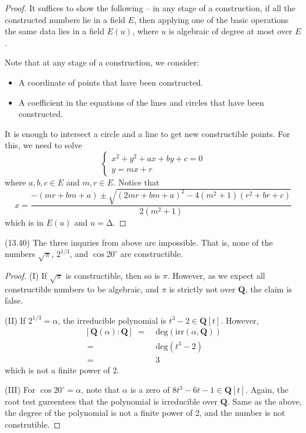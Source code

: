 \vspace{2ex}
\begin{proof}
It suffices to show the following -- in any stage of a construction, if all the constructed numbers lie in a field $E$, then applying one of the basic operations the same data lies in a field $E(u)$, where $u$ is algebraic of degree at most over $E$.

\bigskip

Note that at any stage of a construction, we consider:
\begin{itemize}
\item[(i)] A coordinate of points that have been constructed.
\item[(ii)] A coefficient in the equations of the lines and circles that have been constructed.
\end{itemize}

\bigskip

It is enough to intersect a circle and a line to get new constructible points. For this, we need to solve
\[\begin{cases}
x^2+y^2+ax+by+c=0\\
y=mx+r
\end{cases}\]
where $a,b,c\in E$ and $m,r\in E$. Notice that
\[x=\dfrac{-(mr+bm+a)\pm \sqrt{(2mr+bm+a)^2-4(m^2+1)(r^2+br+c)}}{2(m^2+1)}\]
which is in $E(u)$ and $u=\mathrm{\Delta }$.
\end{proof}
\vspace{2ex}
\begin{cor}
(13.40) The three inquries from above are impossible. That is, none of the numbers $\sqrt{\pi }$, ${2}^{1/3}$, and $\cos 20^{\circ}$ are constructible.
\end{cor}
\vspace{2ex}
\begin{proof}
(I) If $\sqrt{\pi }$ is constructible, then so is $\pi $. However, as we expect all constructible numbers to be algebraic, and $\pi $ is strictly not over ${\bm Q}$, the claim is false.

\bigskip

(II) If ${2}^{1/3}=\alpha $, the irreducible polynomial is $t^3-2\in {\bm Q}[t]$. However,
\[\begin{align*}
[{\bm Q}(\alpha ):{\bm Q}]\;=\;&\mathrm{deg}(\mathrm{irr}(\alpha ,{\bm Q}))\\
\;=\;&\mathrm{deg}(t^3-2)\\
\;=\;&3 
\end{align*}\]
which is not a finite power of 2. 

\bigskip

(III) For $\cos 20^{\circ}=\alpha $, note that $\alpha $ is a zero of $8t^3-6t-1\in {\bm Q}[t]$. Again, the root test gureentees that the polynomial is irreducible over ${\bm Q}$. Same as the above, the degree of the polynomial is not a finite power of 2, and the number is not construtible.
\end{proof}
\vspace{2ex}

